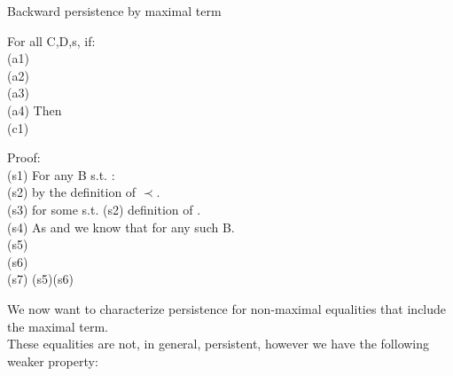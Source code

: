 \noindent
\begin{lemma}{Backward persistence by maximal term}
\label{lemma_4.3.1.11}

\noindent
For all C,D,s, if:\\
(a1) \\
(a2) \\
(a3) \\
(a4) 
Then\\
(c1) 

\bigskip

\noindent
Proof:\\
(s1) For any B s.t. :\\
(s2)  by the definition of $\prec$.\\
(s3)  for some  s.t.  (s2) definition of .\\
(s4) As  and  we know that  for any such B.\\
(s5) \\
(s6) \\
(s7)  (s5)(s6)

\end{lemma}

\noindent
We now want to characterize persistence for non-maximal equalities that include the maximal term.\\
These equalities are not, in general, persistent, however we have the following weaker property:

